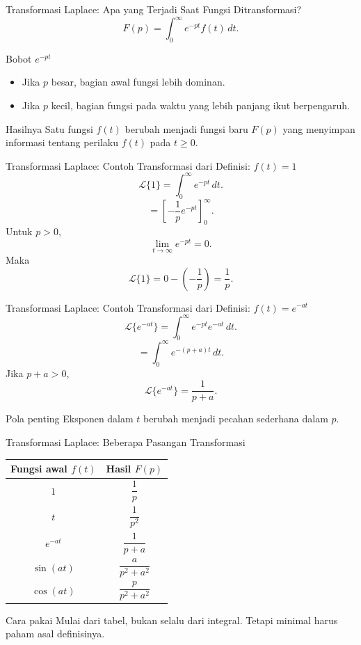 \documentclass[aspectratio=169,11pt]{beamer}
\newcommand{\Lap}{\mathcal{L}}
\begin{document}
\begin{frame}{Transformasi Laplace: Apa yang Terjadi Saat Fungsi Ditransformasi?}
\[
F(p)=\int_0^{\infty} e^{-pt}f(t)\,dt.
\]
\begin{block}{Bobot $e^{-pt}$}
\begin{itemize}
  \item Jika $p$ besar, bagian awal fungsi lebih dominan.
  \item Jika $p$ kecil, bagian fungsi pada waktu yang lebih panjang ikut berpengaruh.
\end{itemize}
\end{block}
\begin{block}{Hasilnya}
Satu fungsi $f(t)$ berubah menjadi fungsi baru $F(p)$ yang menyimpan informasi tentang perilaku $f(t)$ pada $t\ge 0$.
\end{block}
\end{frame}

\begin{frame}{Transformasi Laplace: Contoh Transformasi dari Definisi: $f(t)=1$}
\[
\Lap\{1\}=\int_0^{\infty}e^{-pt}\,dt.
\]
\[
=\left[-\frac{1}{p}e^{-pt}\right]_0^{\infty}.
\]
Untuk $p>0$,
\[
\lim_{t\to\infty}e^{-pt}=0.
\]
Maka
\[
\Lap\{1\}=0-\left(-\frac{1}{p}\right)=\boxed{\frac{1}{p}}.
\]
\end{frame}

\begin{frame}{Transformasi Laplace: Contoh Transformasi dari Definisi: $f(t)=e^{-at}$}
\[
\Lap\{e^{-at}\}=\int_0^{\infty}e^{-pt}e^{-at}\,dt.
\]
\[
=\int_0^{\infty}e^{-(p+a)t}\,dt.
\]
Jika $p+a>0$,
\[
\Lap\{e^{-at}\}=\boxed{\frac{1}{p+a}}.
\]
\begin{alertblock}{Pola penting}
Eksponen dalam $t$ berubah menjadi pecahan sederhana dalam $p$.
\end{alertblock}
\end{frame}

\begin{frame}{Transformasi Laplace: Beberapa Pasangan Transformasi}
\begin{center}
\begin{tabular}{c c}
\toprule
\textbf{Fungsi awal $f(t)$} & \textbf{Hasil $F(p)$} \\
\midrule
$1$ & $\dfrac{1}{p}$ \\
$t$ & $\dfrac{1}{p^2}$ \\
$e^{-at}$ & $\dfrac{1}{p+a}$ \\
$\sin(at)$ & $\dfrac{a}{p^2+a^2}$ \\
$\cos(at)$ & $\dfrac{p}{p^2+a^2}$ \\
\bottomrule
\end{tabular}
\end{center}
\begin{block}{Cara pakai}
Mulai dari tabel, bukan selalu dari integral. Tetapi minimal harus paham asal definisinya.
\end{block}
\end{frame}
\end{document}
